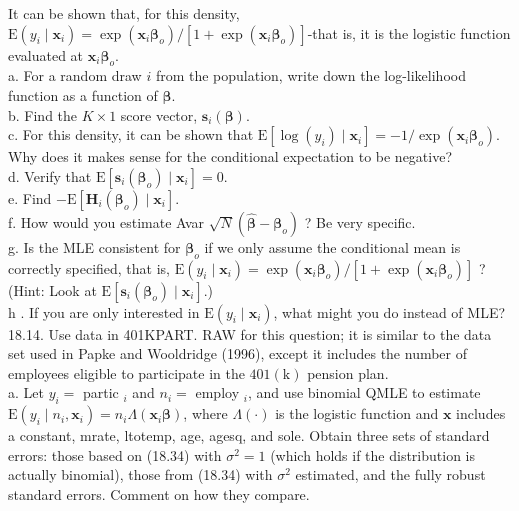 \documentclass[10pt]{article}
\begin{document}
It can be shown that, for this density, $\mathrm{E}\left(y_{i} \mid \mathbf{x}_{i}\right)=\exp \left(\mathbf{x}_{i} \boldsymbol{\beta}_{o}\right) /\left[1+\exp \left(\mathbf{x}_{i} \boldsymbol{\beta}_{o}\right)\right]$-that is, it is the logistic function evaluated at $\mathbf{x}_{i} \boldsymbol{\beta}_{o}$.\\
a. For a random draw $i$ from the population, write down the log-likelihood function as a function of $\boldsymbol{\beta}$.\\
b. Find the $K \times 1$ score vector, $\mathbf{s}_{i}(\boldsymbol{\beta})$.\\
c. For this density, it can be shown that $\mathrm{E}\left[\log \left(y_{i}\right) \mid \mathbf{x}_{i}\right]=-1 / \exp \left(\mathbf{x}_{i} \boldsymbol{\beta}_{o}\right)$. Why does it makes sense for the conditional expectation to be negative?\\
d. Verify that $\mathrm{E}\left[\mathbf{s}_{i}\left(\boldsymbol{\beta}_{o}\right) \mid \mathbf{x}_{i}\right]=0$.\\
e. Find $-\mathrm{E}\left[\mathbf{H}_{i}\left(\boldsymbol{\beta}_{o}\right) \mid \mathbf{x}_{i}\right]$.\\
f. How would you estimate Avar $\sqrt{N}\left(\hat{\boldsymbol{\beta}}-\boldsymbol{\beta}_{o}\right)$ ? Be very specific.\\
g. Is the MLE consistent for $\boldsymbol{\beta}_{o}$ if we only assume the conditional mean is correctly specified, that is, $\mathrm{E}\left(y_{i} \mid \mathbf{x}_{i}\right)=\exp \left(\mathbf{x}_{i} \boldsymbol{\beta}_{o}\right) /\left[1+\exp \left(\mathbf{x}_{i} \boldsymbol{\beta}_{o}\right)\right]$ ? (Hint: Look at $\mathrm{E}\left[\mathbf{s}_{i}\left(\boldsymbol{\beta}_{o}\right) \mid \mathbf{x}_{i}\right]$.)\\
h . If you are only interested in $\mathrm{E}\left(y_{i} \mid \mathbf{x}_{i}\right)$, what might you do instead of MLE?\\
18.14. Use data in 401KPART. RAW for this question; it is similar to the data set used in Papke and Wooldridge (1996), except it includes the number of employees eligible to participate in the $401(\mathrm{k})$ pension plan.\\
a. Let $y_{i}=$ partic $_{i}$ and $n_{i}=$ employ $_{i}$, and use binomial QMLE to estimate $\mathrm{E}\left(y_{i} \mid n_{i}, \mathbf{x}_{i}\right)=n_{i} \Lambda\left(\mathbf{x}_{i} \boldsymbol{\beta}\right)$, where $\Lambda(\cdot)$ is the logistic function and $\mathbf{x}$ includes a constant, mrate, ltotemp, age, agesq, and sole. Obtain three sets of standard errors: those based on (18.34) with $\sigma^{2}=1$ (which holds if the distribution is actually binomial), those from (18.34) with $\sigma^{2}$ estimated, and the fully robust standard errors. Comment on how they compare.\\
\end{document}
